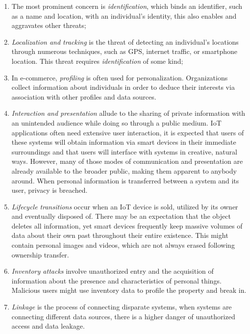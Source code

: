 \documentclass[conference]{IEEEtran}
\begin{document}
\begin{enumerate}
    \item
    The most prominent concern is \textit{identification}, which binds an
    identifier, such as a name and location, with an individual's identity,
    this also enables and aggravates other threats;
    \item
    \textit{Localization and tracking} is the threat of detecting an individual's
    locations through numerous techniques, such as GPS, internet traffic,
    or smartphone location. This threat requires \textit{identification}
    of some kind;
    \item
    In e-commerce, \textit{profiling} is often used for personalization.
    Organizations collect information about individuals in order to deduce
    their interests via association with other profiles and data sources.
    \item
    \textit{Interaction and presentation} allude to the sharing of private
    information with an unintended audience while doing so through a public
    medium. IoT applications often need extensive user interaction, it is
    expected that users of these systems will obtain information via smart
    devices in their immediate surroundings and that users will interface
    with systems in creative, natural ways. However, many of those modes
    of communication and presentation are already available to the broader
    public, making them apparent to anybody around. When personal information
    is transferred between a system and its user, privacy is breached.
    \item
    \textit{Lifecycle transitions} occur when an IoT device is sold, utilized
    by its owner and eventually disposed of. There may be an expectation
    that the object deletes all information, yet smart devices frequently
    keep massive volumes of data about their own past throughout their entire
    existence. This might contain personal images and videos, which are
    not always erased following ownership transfer.
    \item
    \textit{Inventory attacks} involve unauthorized entry and the acquisition
    of information about the presence and characteristics of personal things.
    Malicious users might use inventory data to profile the property and
    break in.
    \item
    \textit{Linkage} is the process of connecting disparate systems, when
    systems are connecting different data sources, there is a higher danger
    of unauthorized access and data leakage.
\end{enumerate}
\end{document}
